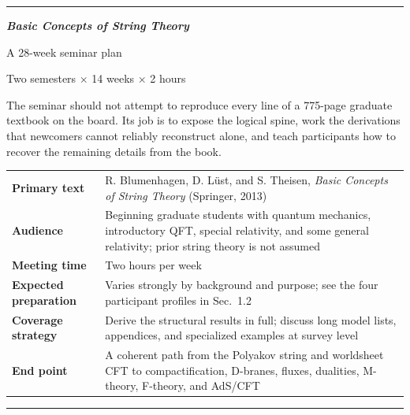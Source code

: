 \documentclass[11pt]{article}
\begin{document}
\hypersetup{pageanchor=false}

\begin{titlepage}
\pagecolor{paper}
\color{ink}
\vspace*{15mm}

{\color{gold}\rule{\textwidth}{1.2pt}}
\vspace{8mm}

{\Huge\bfseries\color{navy}
\emph{Basic Concepts of String Theory}}

\vspace{3mm}
{\LARGE\color{blue}A 28-week seminar plan}

\vspace{9mm}
{\Large Two semesters $\times$ 14 weeks $\times$ 2 hours}

\vspace{13mm}

\begin{keybox}
The seminar should not attempt to reproduce every line of a 775-page graduate
textbook on the board.  Its job is to expose the logical spine, work the
derivations that newcomers cannot reliably reconstruct alone, and teach
participants how to recover the remaining details from the book.
\end{keybox}

\vfill

\begin{tabularx}{\textwidth}{@{}>{\bfseries\color{navy}}p{34mm}X@{}}
Primary text & R. Blumenhagen, D. L\"ust, and S. Theisen,
\emph{Basic Concepts of String Theory} (Springer, 2013) \tabularnewline
Audience & Beginning graduate students with quantum mechanics, introductory
QFT, special relativity, and some general relativity; prior string theory is not
assumed \tabularnewline
Meeting time & Two hours per week \tabularnewline
Expected preparation & Varies strongly by background and purpose; see the four
participant profiles in Sec.~1.2 \tabularnewline
Coverage strategy & Derive the structural results in full; discuss long model
lists, appendices, and specialized examples at survey level \tabularnewline
End point & A coherent path from the Polyakov string and worldsheet CFT to
compactification, D-branes, fluxes, dualities, M-theory, F-theory, and AdS/CFT
\end{tabularx}

\vspace{8mm}
{\color{gold}\rule{\textwidth}{1.2pt}}
\end{titlepage}
\nopagecolor
\hypersetup{pageanchor=true}
\end{document}
